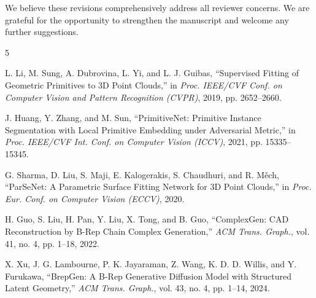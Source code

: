 \documentclass[11pt]{article}
\begin{document}
\bigskip
\noindent We believe these revisions comprehensively address all reviewer
concerns. We are grateful for the opportunity to strengthen the manuscript
and welcome any further suggestions.

\begin{thebibliography}{5}

L. Li, M. Sung, A. Dubrovina, L. Yi, and L. J. Guibas,
``Supervised Fitting of Geometric Primitives to 3D Point Clouds,''
in \emph{Proc. IEEE/CVF Conf. on Computer Vision and Pattern Recognition (CVPR)}, 2019, pp. 2652--2660.

J. Huang, Y. Zhang, and M. Sun,
``PrimitiveNet: Primitive Instance Segmentation with Local Primitive Embedding under Adversarial Metric,''
in \emph{Proc. IEEE/CVF Int. Conf. on Computer Vision (ICCV)}, 2021, pp. 15335--15345.

G. Sharma, D. Liu, S. Maji, E. Kalogerakis, S. Chaudhuri, and R. M\v{e}ch,
``ParSeNet: A Parametric Surface Fitting Network for 3D Point Clouds,''
in \emph{Proc. Eur. Conf. on Computer Vision (ECCV)}, 2020.

H. Guo, S. Liu, H. Pan, Y. Liu, X. Tong, and B. Guo,
``ComplexGen: CAD Reconstruction by B-Rep Chain Complex Generation,''
\emph{ACM Trans. Graph.}, vol. 41, no. 4, pp. 1--18, 2022.

X. Xu, J. G. Lambourne, P. K. Jayaraman, Z. Wang, K. D. D. Willis, and Y. Furukawa,
``BrepGen: A B-Rep Generative Diffusion Model with Structured Latent Geometry,''
\emph{ACM Trans. Graph.}, vol. 43, no. 4, pp. 1--14, 2024.

\end{thebibliography}
\end{document}
